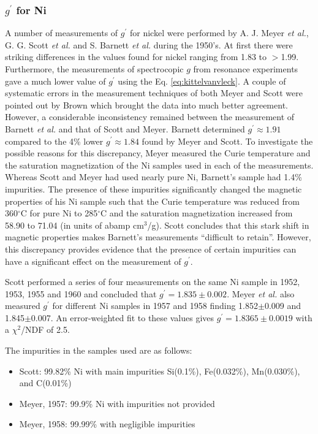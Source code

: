 \documentclass[preprint,12pt]{elsarticle}
\begin{document}
\subsubsection{ $ g^{\prime}$ for Ni}
A number of measurements of $g^{\prime}$ for nickel were performed by A. J. Meyer {\it et al.}, G. G. Scott {\it et al.} and S. Barnett {\it et al.} during the 1950's. At first there were striking differences in the values found for nickel ranging from 1.83 to $>$1.99. Furthermore, the measurements of spectrocopic $g$ from resonance experiments gave a much lower value of $g^{\prime}$ using the Eq. \ref{eq:kittelvanvleck}. A couple of systematic errors in the measurement techniques of both Meyer and Scott were pointed out by Brown which brought the data into much better agreement\cite{Scott1962}. However, a considerable inconsistency remained between the measurement of Barnett {\it et al.} and that of Scott and Meyer. Barnett determined $g^{\prime}\approx1.91$ compared to the 4\% lower $g^{\prime}\approx1.84$ found by Meyer and Scott\cite{Meyer1961,Scott1962}. To investigate the possible reasons for this discrepancy, Meyer measured the Curie temperature and the saturation magnetization of the Ni samples used in each of the measurements. Whereas Scott and Meyer had used nearly pure Ni, Barnett's sample had 1.4\% impurities. The presence of these impurities significantly changed the magnetic properties of his Ni sample such that the Curie temperature was reduced from 360$^{\circ}$C for pure Ni to 285$^{\circ}$C and the saturation magnetization increased from 58.90 to 71.04 (in units of abamp cm$^3$/g)\cite{Scott1962}. Scott concludes that this stark shift in magnetic properties makes Barnett's measurements ``difficult to retain''\cite{Scott1962}. However, this discrepancy provides evidence that the presence of certain impurities can have a significant effect on the measurement of $g^\prime$.

Scott performed a series of four measurements on the same Ni sample in 1952, 1953, 1955 and 1960 and concluded that $g^{\prime}=1.835\pm0.002$\cite{Scott1962}. Meyer {\it et al.} also measured $g^{\prime}$ for different Ni samples in 1957 and 1958 finding 1.852$\pm$0.009 and 1.845$\pm$0.007\cite{Meyer1961}. An error-weighted fit to these values gives $g^{\prime}=1.8365\pm0.0019$ with a $\chi^2$/NDF of 2.5. 

The impurities in the samples used are as follows:
\begin{itemize}
\item{Scott: 99.82\% Ni with main impurities Si(0.1\%), Fe(0.032\%), Mn(0.030\%), and C(0.01\%)\cite{ScottSep1955}}
\item{Meyer, 1957: 99.9\% Ni with impurities not provided\cite{Meyer1957}}
\item{Meyer, 1958: 99.99\% with negligible impurities\cite{Meyer1961}}
\end{itemize}
\end{document}
